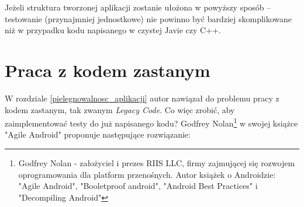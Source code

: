 Jeżeli struktura tworzonej aplikacji zostanie ułożona w powyższy sposób – testowanie (przynajmniej jednostkowe) nie powinno być bardziej skomplikowane niż w przypadku kodu napisanego w czystej Javie czy C++.

\section{Praca z kodem zastanym}
\label{legacy_code}
W rozdziale \ref{pielegnowalnosc_aplikacji} autor nawiązał do problemu pracy z kodem zastanym, tak zwanym \textit{Legacy Code}.
Co więc zrobić, aby zaimplementować testy do już napisanego kodu? Godfrey Nolan\footnote{Godfrey Nolan - założyciel i prezes RIIS LLC, firmy zajmującej się rozwojem oprogramowania dla platform przenośnych. Autor książek o Androidzie: "Agile Android", "Booletproof android", "Android Best Practices" i "Decompiling Android"} w swojej książce "Agile Android"\cite{bib:agile:android} proponuje następujące rozwiązanie:

